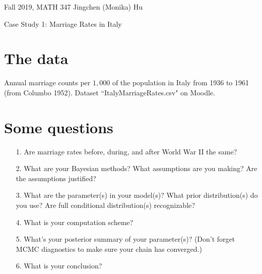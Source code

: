 \documentclass[11pt]{article}
\begin{document}
\enlargethispage{\baselineskip}

Fall 2019, MATH 347 \hfill Jingchen (Monika) Hu\\

\begin{center}
{\huge Case Study 1: Marriage Rates in Italy}	
\end{center}
\vspace{0.5cm}


\section{The data} 

Annual marriage counts per $1,000$ of the population in Italy from 1936 to 1961 (from Columbo 1952). Dataset ``ItalyMarriageRates.csv" on Moodle.

\section{Some questions} 

\begin{itemize}
\item[1.] Are marriage rates before, during, and after World War II the same?

\item[2.] What are your Bayesian methods? What assumptions are you making? Are the assumptions justified?

\item[3.] What are the parameter(s) in your model(s)? What prior distribution(s) do you use? Are full conditional distribution(s) recognizable?

\item[4.] What is your computation scheme?

\item[5.] What's your posterior summary of your parameter(s)? (Don't forget MCMC diagnostics to make sure your chain has converged.)

\item[6.] What is your conclusion?
\end{itemize}
\end{document}
